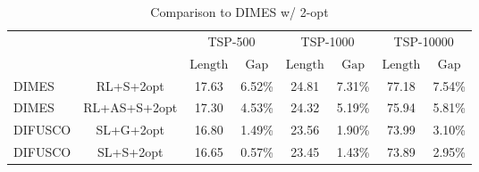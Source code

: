 \begin{table}[t]
\centering
\caption{Comparing discrete diffusion and continuous diffusion on TSP-100 with various diffusion steps and numbers of parallel sampling. \texttt{cosine} schedule is used for fast sampling.}
\label{tab:tsp100_compare}
\end{table}

\begin{table}[h]
\centering
\small
\caption{Comparison to DIMES w/ 2-opt}
\begin{sc}
\begin{tabular}{lccccccc}
\toprule
& & \multicolumn{2}{c}{TSP-500} & \multicolumn{2}{c}{TSP-1000} & \multicolumn{2}{c}{TSP-10000} \\ 
& & $\mathrm{Length}$ & $\mathrm{Gap}$ & $\mathrm{Length}$ & $\mathrm{Gap}$ & $\mathrm{Length}$ & $\mathrm{Gap}$ \\ 
\midrule
DIMES & RL+S+2opt & 17.63 & 6.52\% & 24.81 & 7.31\% & 77.18 & 7.54\% \\
DIMES & RL+AS+S+2opt & 17.30 & 4.53\% & 24.32 & 5.19\% & 75.94 & 5.81\% \\
DIFUSCO & SL+G+2opt & 16.80 & 1.49\% & 23.56 & 1.90\% & 73.99 & 3.10\% \\
DIFUSCO & SL+S+2opt & 16.65 & 0.57\% & 23.45 & 1.43\% & 73.89 & 2.95\% \\
\bottomrule
\end{tabular}
\end{sc}
\label{tab:dimes_2opt}
\end{table}


